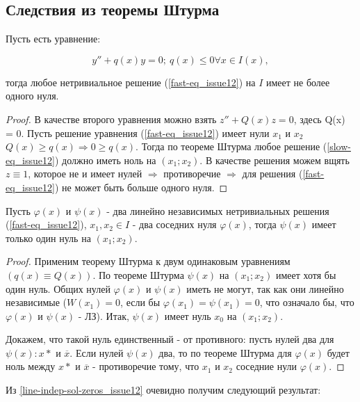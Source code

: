 \subsection{Следствия из теоремы Штурма}

\begin{corollary}\label{zero-quant_in-diff_issue12}
Пусть есть уравнение:

\[y'' + q(x)y = 0; \: q(x) \leq0 \forall x \in I(x),\]

тогда любое нетривиальное решение (\ref{fast-eq_issue12}) на $I$ имеет не более одного нуля.
\end{corollary}

\begin{proof}
В качестве второго уравнения можно взять $z'' + Q(x)z = 0$, здесь Q(x) = 0. Пусть решение уравнения (\ref{fast-eq_issue12}) имеет нули $x_1$ и $x_2$ $Q(x) \geq q(x) \Rightarrow 0 \geq q(x)$. Тогда по теореме Штурма любое решение (\ref{slow-eq_issue12}) должно иметь ноль на $(x_1;x_2)$. В качестве решения можем вщять $z\equiv 1$, которое не и имеет нулей $\Rightarrow$ противоречие $\Rightarrow$ для решения (\ref{fast-eq_issue12}) не может быть больше одного нуля.
\end{proof}

\begin{corollary}\label{line-indep-sol-zeros_issue12}
Пусть $\varphi (x)$ и $\psi (x)$ - два линейно независимых нетривиальных решения (\ref{fast-eq_issue12}), $x_1, x_2 \in I$ - два соседних нуля $\varphi (x)$, тогда $\psi (x)$ имеет только один нуль на $(x_1;x_2)$.
\end{corollary}

\begin{proof}
Применим теорему Штурма к двум одинаковым уравнениям $(q(x) \equiv Q(x))$. По теореме Штурма $\psi (x)$ на $(x_1;x_2)$ имеет хотя бы один нуль. Общих нулей $\varphi (x)$ и $\psi (x)$ иметь не могут, так как они линейно независимые ($W(x_1) = 0$, если бы $\varphi (x_1) = \psi (x_1) = 0$, что означало бы, что $\varphi(x)$ и $\psi(x)$ - ЛЗ). Итак, $\psi (x)$ имеет нуль $x_0$ на $(x_1;x_2)$.

Докажем, что такой нуль единственный - от противного: пусть нулей два для $\psi (x): x*$ и $\overline{x}$. Если нулей $\psi (x)$ два, то по теореме Штурма для $\varphi (x)$ будет ноль между $x*$ и $\overline{x}$ - противоречие тому, что $x_1$ и $x_2$ соседние нули $\varphi (x)$.
\end{proof}

Из \ref{line-indep-sol-zeros_issue12} очевидно получим следующий результат:

